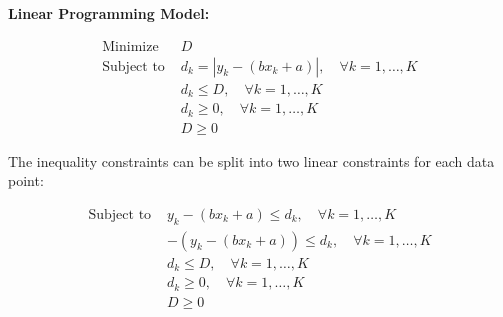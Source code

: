 \documentclass{article}
\begin{document}
\textbf{Linear Programming Model:}

\begin{align*}
\text{Minimize } & D \\
\text{Subject to } & d_k = |y_k - (bx_k + a)|, \quad \forall k = 1, \ldots, K \\
& d_k \leq D, \quad \forall k = 1, \ldots, K \\
& d_k \geq 0, \quad \forall k = 1, \ldots, K \\
& D \geq 0
\end{align*}

The inequality constraints can be split into two linear constraints for each data point:

\begin{align*}
\text{Subject to } & y_k - (bx_k + a) \leq d_k, \quad \forall k = 1, \ldots, K \\
& -(y_k - (bx_k + a)) \leq d_k, \quad \forall k = 1, \ldots, K \\
& d_k \leq D, \quad \forall k = 1, \ldots, K \\
& d_k \geq 0, \quad \forall k = 1, \ldots, K \\
& D \geq 0
\end{align*}
\end{document}
